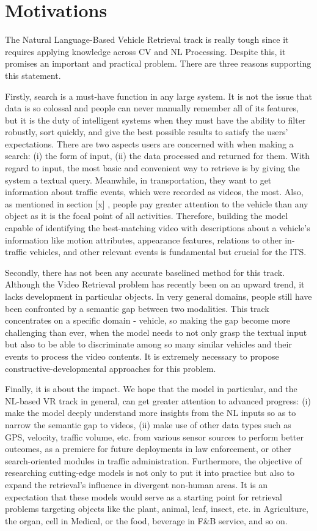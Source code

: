 \section{Motivations}
\label{sec:motivation}
The Natural Language-Based Vehicle Retrieval track is really tough since it requires applying knowledge across CV and NL Processing. Despite this, it promises an important and practical problem. There are three reasons supporting this statement.

Firstly, search is a must-have function in any large system. It is not the issue that data is so colossal and people can never manually remember all of its features, but it is the duty of intelligent systems when they must have the ability to filter robustly, sort quickly, and give the best possible results to satisfy the users' expectations. There are two aspects users are concerned with when making a search: (i) the form of input, (ii) the data processed and returned for them. With regard to input, the most basic and convenient way to retrieve is by giving the system a textual query. Meanwhile, in transportation, they want to get information about traffic events, which were recorded as videos, the most. Also, as mentioned in section [x] , people pay greater attention to the vehicle than any object as it is the focal point of all activities. Therefore, building the model capable of identifying the best-matching video with descriptions about a vehicle’s information like motion attributes, appearance features, relations to other in-traffic vehicles, and other relevant events is fundamental but crucial for the ITS.

Secondly, there has not been any accurate baselined method for this track. Although the Video Retrieval problem has recently been on an upward trend, it lacks development in particular objects. In very general domains, people still have been confronted by a semantic gap between two modalities. This track concentrates on a specific domain - vehicle, so making the gap become more challenging than ever, when the model needs to not only grasp the textual input but also to be able to discriminate among so many similar vehicles and their events to process the video contents. It is extremely necessary to propose constructive-developmental approaches for this problem.

Finally, it is about the impact. We hope that the model in particular, and the NL-based VR track in general, can get greater attention to advanced progress: (i) make the model deeply understand more insights from the NL inputs so as to narrow the semantic gap to videos, (ii) make use of other data types such as GPS, velocity, traffic volume, etc. from various sensor sources to perform better outcomes, as a premiere for future deployments in law enforcement, or other search-oriented modules in traffic administration. Furthermore, the objective of researching cutting-edge models is not only to put it into practice but also to expand the retrieval’s influence in divergent non-human areas. It is an expectation that these models would serve as a starting point for retrieval problems targeting objects like the plant, animal, leaf, insect, etc. in Agriculture, the organ, cell in Medical, or the food, beverage in F\&B service, and so on.


